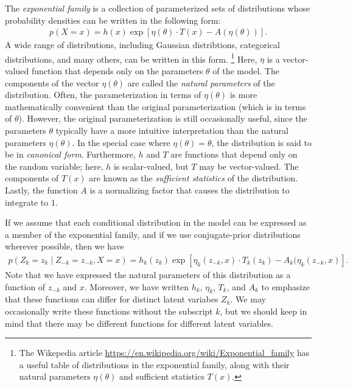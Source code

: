\documentclass[11pt]{article}
\begin{document}
The \emph{exponential family} is a collection of parameterized sets of distributions whose probability densities can be written in the following form:
\begin{align}
p(X = x) = h(x) \exp\left[ \eta(\theta) \cdot T(x) - A(\eta(\theta)) \right].
\end{align}
A wide range of distributions, including Gaussian distribtions, categorical distributions, and many others, can be written in this form.%
\footnote{The Wikepedia article \url{https://en.wikipedia.org/wiki/Exponential_family} has a useful table of distributions in the exponential family, along with their natural parameters $\eta(\theta)$ and sufficient statistics $T(x)$.}
Here, $\eta$ is a vector-valued function that depends only on the parameters $\theta$ of the model.
The components of the vector $\eta(\theta)$ are called the \emph{natural parameters} of the distribution.
Often, the parameterization in terms of $\eta(\theta)$ is more mathematically convenient than the original parameterization (which is in terms of $\theta$).
However, the original parameterization is still occasionally useful, since the parameters $\theta$ typically have a more intuitive interpretation than the natural parameters $\eta(\theta)$.
In the special case where $\eta(\theta) = \theta$, the distribution is said to be in \emph{canonical form}.
Furthermore, $h$ and $T$ are functions that depend only on the random variable;
here, $h$ is scalar-valued, but $T$ may be vector-valued.
The components of $T(x)$ are known as the \emph{sufficient statistics} of the distribution.
Lastly, the function $A$ is a normalizing factor that causes the distribution to integrate to $1$.

If we assume that each conditional distribution in the model can be expressed as a member of the exponential family, and if we use conjugate-prior distributions wherever possible, then we have
\begin{align}
p(Z_k = z_k \mid Z_{-k} = z_{-k}, X = x) = h_k(z_k) \exp\left[ \eta_k(z_{-k}, x) \cdot T_k(z_k) - A_k(\eta_k(z_{-k}, x) \right].
\end{align}
Note that we have expressed the natural parameters of this distribution as a function of $z_{-k}$ and $x$.
Moreover, we have written $h_k$, $\eta_k$, $T_k$, and $A_k$ to emphasize that these functions can differ for distinct latent variabes $Z_k$.
We may occasionally write these functions without the subscript $k$, but we should keep in mind that there may be different functions for different latent variables.
\end{document}
